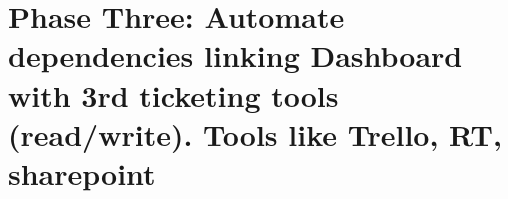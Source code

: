 \part{Phase Three: Automate dependencies linking Dashboard with 3rd ticketing
tools (read/write). Tools like Trello, RT, sharepoint}

